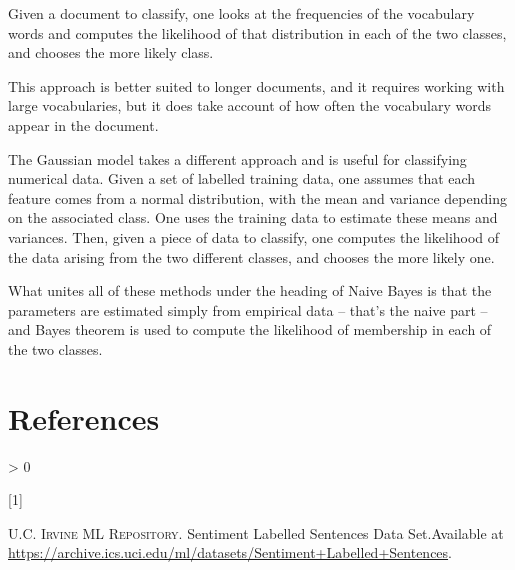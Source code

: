 \documentclass[
]{article}
\newlength{\cslhangindent}
\newlength{\csllabelwidth}
\newenvironment{CSLReferences}[3] %
 {%
  \setlength{\parindent}{0pt}
  \ifodd #1 \everypar{\setlength{\hangindent}{\cslhangindent}}\ignorespaces\fi
  \ifnum #2 > 0
  \setlength{\parskip}{#3\baselineskip}
  \fi
 }%
 {}
\newcommand{\CSLLeftMargin}[1]{\parbox[t]{\maxof{\widthof{#1}}{\csllabelwidth}}{#1}}
\newcommand{\CSLRightInline}[1]{\parbox[t]{\linewidth}{#1}}
\begin{document}
Given a document to classify, one looks at the frequencies of the
vocabulary words and computes the likelihood of that distribution in
each of the two classes, and chooses the more likely class.

This approach is better suited to longer documents, and it requires
working with large vocabularies, but it does take account of how often
the vocabulary words appear in the document.

The Gaussian model takes a different approach and is useful for
classifying numerical data. Given a set of labelled training data, one
assumes that each feature comes from a normal distribution, with the
mean and variance depending on the associated class. One uses the
training data to estimate these means and variances. Then, given a piece
of data to classify, one computes the likelihood of the data arising
from the two different classes, and chooses the more likely one.

What unites all of these methods under the heading of Naive Bayes is
that the parameters are estimated simply from empirical data -- that's
the naive part -- and Bayes theorem is used to compute the likelihood of
membership in each of the two classes.

\hypertarget{bibliography}{%
\section*{References}\label{bibliography}}

\hypertarget{refs}{}
\begin{CSLReferences}{0}{0}
\leavevmode\hypertarget{ref-sentences}{}%
\CSLLeftMargin{{[}1{]} }
\CSLRightInline{\textsc{U.C. Irvine ML Repository}. {Sentiment Labelled
Sentences Data Set}.Available at
\url{https://archive.ics.uci.edu/ml/datasets/Sentiment+Labelled+Sentences}.}

\end{CSLReferences}
\end{document}

